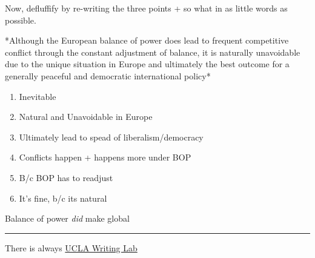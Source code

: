 \documentclass[letterpaper]{article}
\begin{document}
Now, defluffify by re-writing the three points + so what in as little
words as possible.

*Although the European balance of power does lead to frequent
competitive conflict through the constant adjustment of balance, it is
naturally unavoidable due to the unique situation in Europe and
ultimately the best outcome for a generally peaceful and democratic
international policy*

\begin{enumerate}
\item Inevitable

\item Natural and Unavoidable in Europe

\item Ultimately lead to spead of liberalism/democracy

\item Conflicts happen + happens more under BOP

\item B/c BOP has to readjust

\item It's fine, b/c its natural
\end{enumerate}

Balance of power \emph{did} make global

\noindent\rule{\textwidth}{0.5pt}

There is always
\href{https://wp.ucla.edu/wp-content/uploads/2016/01/UWC\_handouts\_What-How-So-What-Thesis-revised-5-4-15-RZ.pdf}{UCLA
Writing Lab}
\end{document}
